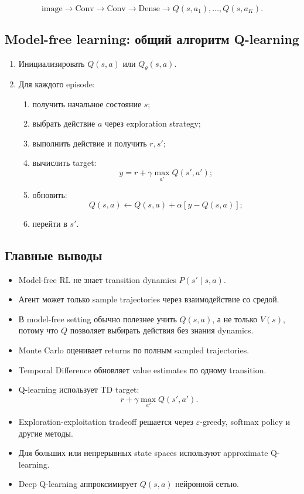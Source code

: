 \documentclass[a4paper,12pt]{article}
\begin{document}
\[
\text{image}
\rightarrow
\text{Conv}
\rightarrow
\text{Conv}
\rightarrow
\text{Dense}
\rightarrow
Q(s,a_1),\dots,Q(s,a_K).
\]

\subsection{Model-free learning: общий алгоритм Q-learning}

\begin{enumerate}
    \item Инициализировать \(Q(s,a)\) или \(Q_\theta(s,a)\).
    \item Для каждого episode:
    \begin{enumerate}
        \item получить начальное состояние \(s\);
        \item выбрать действие \(a\) через exploration strategy;
        \item выполнить действие и получить \(r, s'\);
        \item вычислить target:
        \[
        y = r + \gamma \max_{a'}Q(s',a');
        \]
        \item обновить:
        \[
        Q(s,a)
        \leftarrow
        Q(s,a)
        +
        \alpha[y-Q(s,a)];
        \]
        \item перейти в \(s'\).
    \end{enumerate}
\end{enumerate}

\subsection{Главные выводы}

\begin{itemize}
    \item Model-free RL не знает transition dynamics \(P(s'\mid s,a)\).
    \item Агент может только sample trajectories через взаимодействие со средой.
    \item В model-free setting обычно полезнее учить \(Q(s,a)\), а не только \(V(s)\), потому что \(Q\) позволяет выбирать действия без знания dynamics.
    \item Monte Carlo оценивает returns по полным sampled trajectories.
    \item Temporal Difference обновляет value estimates по одному transition.
    \item Q-learning использует TD target:
    \[
    r+\gamma\max_{a'}Q(s',a').
    \]

    \item Exploration-exploitation tradeoff решается через \(\varepsilon\)-greedy, softmax policy и другие методы.
    \item Для больших или непрерывных state spaces используют approximate Q-learning.
    \item Deep Q-learning аппроксимирует \(Q(s,a)\) нейронной сетью.
\end{itemize}
\end{document}

